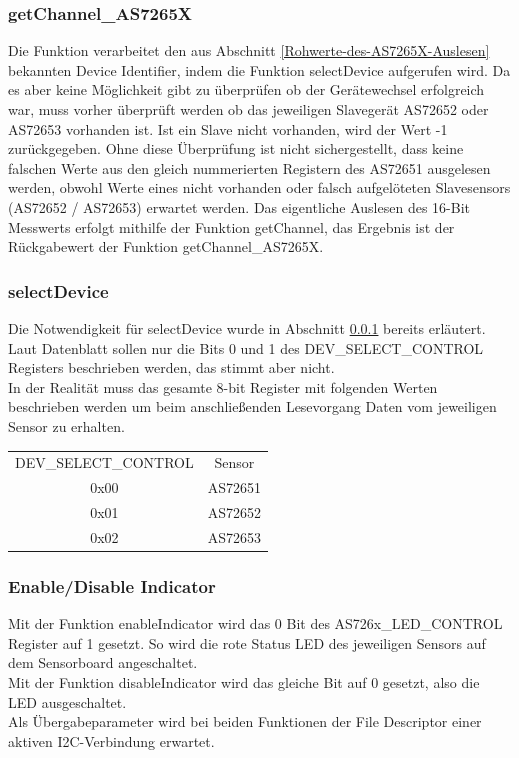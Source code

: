 \subsubsection{getChannel\_AS7265X}\label{getChannel_AS7265X}
Die Funktion verarbeitet den aus Abschnitt \ref{Rohwerte-des-AS7265X-Auslesen} bekannten Device Identifier, indem die Funktion selectDevice aufgerufen wird.
	Da es aber keine Möglichkeit gibt zu überprüfen ob der Gerätewechsel erfolgreich war, muss vorher überprüft werden ob das jeweiligen Slavegerät AS72652 oder AS72653 vorhanden ist.
	Ist ein Slave nicht vorhanden, wird der Wert -1 zurückgegeben.
	Ohne diese Überprüfung ist nicht sichergestellt, dass keine falschen Werte aus den gleich nummerierten Registern des AS72651 ausgelesen werden, obwohl Werte eines nicht vorhanden oder falsch aufgelöteten Slavesensors (AS72652 / AS72653) erwartet werden.
	Das eigentliche Auslesen des 16-Bit Messwerts erfolgt mithilfe der Funktion getChannel, das Ergebnis ist der Rückgabewert der Funktion getChannel\_AS7265X.\\


\newpage
\subsubsection{selectDevice}
Die Notwendigkeit für selectDevice wurde in Abschnitt \ref{getChannel_AS7265X} bereits erläutert.
Laut Datenblatt sollen nur die Bits 0 und 1 des DEV\_SELECT\_CONTROL Registers beschrieben werden, das stimmt aber nicht.\\
In der Realität muss das gesamte 8-bit Register mit folgenden Werten beschrieben werden um beim anschließenden Lesevorgang Daten vom jeweiligen Sensor zu erhalten.
\begin{center}
\begin{tabular}{ c c }
 	DEV\_SELECT\_CONTROL & Sensor \\ 
 	0x00 & AS72651 \\  
 	0x01 & AS72652 \\
 	0x02 & AS72653 \\  
\end{tabular}
\end{center}



\subsubsection{Enable/Disable Indicator}
Mit der Funktion enableIndicator wird das 0 Bit des AS726x\_LED\_CONTROL Register auf 1 gesetzt. So wird die rote Status LED des jeweiligen Sensors auf dem Sensorboard angeschaltet.\\
Mit der Funktion disableIndicator wird das gleiche Bit auf 0 gesetzt, also die LED ausgeschaltet.\\
Als Übergabeparameter wird bei beiden Funktionen der File Descriptor einer aktiven I2C-Verbindung erwartet.\\

